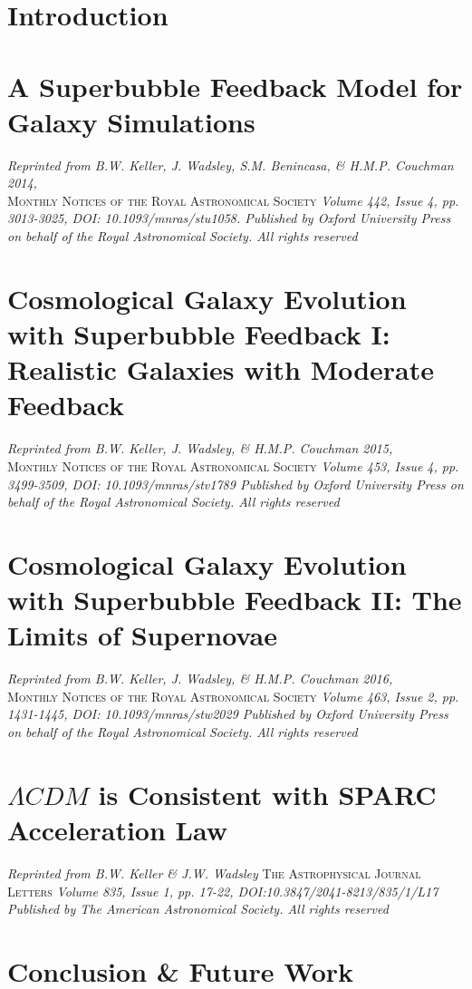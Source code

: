\documentclass[letterpaper,12pt,twoside,openright]{report} %
\begin{document}

\chapter{Introduction}
\thispagestyle{fancy}


\chapter{A Superbubble Feedback Model for Galaxy Simulations}
\thispagestyle{fancy}
\textit{Reprinted from B.W. Keller, J. Wadsley, S.M. Benincasa, \& H.M.P.
Couchman 2014,} \\ \textsc{Monthly Notices of the Royal Astronomical Society}
\textit{Volume 442, Issue 4, pp. 3013-3025, DOI: 10.1093/mnras/stu1058.
Published by Oxford University Press on behalf of the Royal Astronomical
Society.  All rights reserved}

\chapter{Cosmological Galaxy Evolution with Superbubble Feedback I: Realistic
Galaxies with Moderate Feedback}
\thispagestyle{fancy}
\textit{Reprinted from B.W. Keller, J. Wadsley, \& H.M.P.
Couchman 2015,} \\ \textsc{Monthly Notices of the Royal Astronomical Society}
\textit{Volume 453, Issue 4, pp. 3499-3509, DOI: 10.1093/mnras/stv1789
Published by Oxford University Press on behalf of the Royal Astronomical
Society.  All rights reserved}

\chapter{Cosmological Galaxy Evolution with Superbubble Feedback II: The Limits
of Supernovae}
\thispagestyle{fancy}
\textit{Reprinted from B.W. Keller, J. Wadsley, \& H.M.P.
Couchman 2016,} \\ \textsc{Monthly Notices of the Royal Astronomical Society}
\textit{Volume 463, Issue 2, pp. 1431-1445, DOI: 10.1093/mnras/stw2029
Published by Oxford University Press on behalf of the Royal Astronomical
Society.  All rights reserved}

\chapter{$\Lambda CDM$ is Consistent with SPARC Acceleration Law}
\thispagestyle{fancy}
\textit{Reprinted from B.W. Keller \& J.W. Wadsley}
\textsc{The Astrophysical Journal Letters} 
\textit{Volume 835, Issue 1, pp.
17-22, DOI:10.3847/2041-8213/835/1/L17 Published by The American Astronomical
Society.  All rights reserved}

\chapter{Conclusion \& Future Work}
\thispagestyle{fancy}

\end{document}
